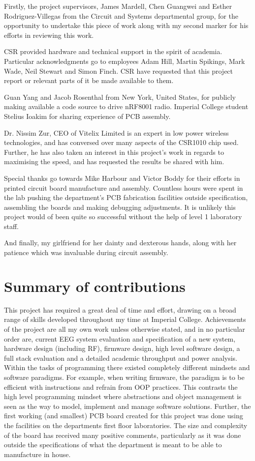 \documentclass[]{article}
\begin{document}
Firstly, the project supervisors, James Mardell, Chen Guangwei and Esther Rodriguez-Villegas from the Circuit and Systems departmental group, for the opportunity to undertake this piece of work along with my second marker for his efforts in reviewing this work. 

\ac{CSR} provided hardware and technical support in the spirit of academia. Particular acknowledgments go to employees Adam Hill, Martin Spikings, Mark Wade, Neil Stewart and Simon Finch. CSR have requested that this project report or relevant parts of it be made available to them.

Guan Yang and Jacob Rosenthal from New York, United States, for publicly making available a code source to drive nRF8001 radio. Imperial College student Stelius Ioakim for sharing experience of \ac{PCB} assembly. 

Dr. Nissim Zur, CEO of Vitelix Limited is an expert in low power wireless technologies, and has conversed over many aspects of the CSR1010 chip used. Further, he has also taken an interest in this project's work in regards to maximising the speed, and has requested the results be shared with him.

Special thanks go towards Mike Harbour and Victor Boddy for their efforts in printed circuit board manufacture and assembly. Countless hours were spent in the lab pushing the department's PCB fabrication facilities outside specification, assembling the boards and making debugging adjustments. It is unlikely this project would of been quite so successful without the help of level 1 laboratory staff. 

And finally, my girlfriend for her dainty and dexterous hands, along with her patience which was invaluable during circuit assembly. 




\clearpage
\section{Summary of contributions}
This project has required a great deal of time and effort, drawing on a broad range of skills developed throughout my time at Imperial College. Achievements of the project are all my own work unless otherwise stated, and in no particular order are, current \ac{EEG} system evaluation and specification of a new system, hardware design (including RF), firmware design, high level software design, a full stack evaluation and a detailed academic throughput and power analysis. Within the tasks of programming there existed completely different mindsets and software paradigms. For example, when writing firmware, the paradigm is to be efficient with instructions and refrain from \ac{OOP} practices. This contrasts the high level programming mindset where abstractions and object management is seen as the way to model, implement and manage software solutions. Further, the first working (and smallest) \ac{PCB} board created for this project was done using the facilities on the departments first floor laboratories. The size and complexity of the board has received many positive comments, particularly as it was done outside the specifications of what the department is meant to be able to manufacture in house. 
\end{document}
